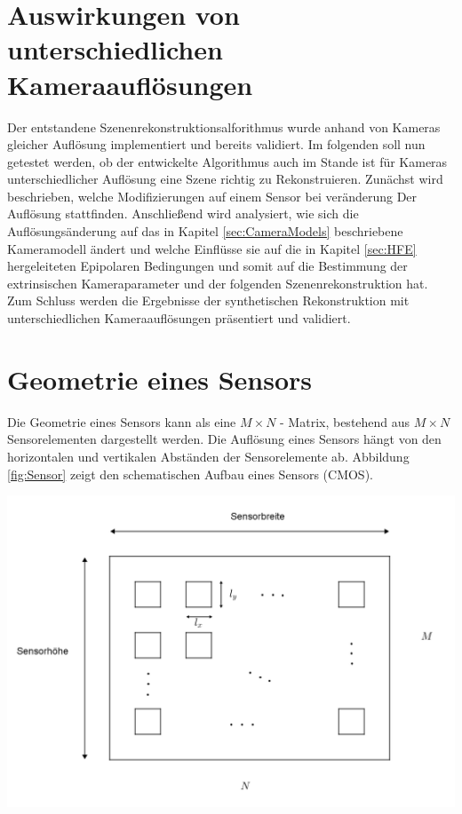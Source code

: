 \section{Auswirkungen von unterschiedlichen Kameraauflösungen}
\label{sec:minimalAuf} 

Der entstandene Szenenrekonstruktionsalforithmus wurde anhand von Kameras gleicher Auflösung implementiert und bereits validiert. Im folgenden soll nun getestet werden, ob der entwickelte Algorithmus auch im Stande ist für Kameras unterschiedlicher Auflösung eine Szene richtig zu Rekonstruieren. Zunächst wird beschrieben, welche Modifizierungen auf einem Sensor bei veränderung Der Auflösung stattfinden. Anschließend wird analysiert, wie sich die Auflösungsänderung auf das in Kapitel \ref{sec:CameraModels} beschriebene Kameramodell ändert und welche Einflüsse sie auf die in Kapitel \ref{sec:HFE} hergeleiteten Epipolaren Bedingungen und somit auf die Bestimmung der extrinsischen Kameraparameter und der folgenden Szenenrekonstruktion hat. Zum Schluss werden die Ergebnisse der synthetischen Rekonstruktion mit unterschiedlichen Kameraauflösungen präsentiert und validiert.
 

\section{Geometrie eines Sensors}


Die Geometrie eines Sensors kann als eine  $M \times N$ - Matrix, bestehend aus $M \times N$ Sensorelementen dargestellt werden\cite{Photonik}. Die Auflösung eines Sensors hängt von den horizontalen und vertikalen Abständen der Sensorelemente ab. Abbildung \ref{fig:Sensor} zeigt den schematischen Aufbau eines Sensors (CMOS). 

\begin{minipage}{\linewidth}
	\centering
	\includegraphics[width=.8\linewidth]{images/Bildsensor_mit_Pixel.png}
	\label{fig:Sensor}
\end{minipage}\\\\


